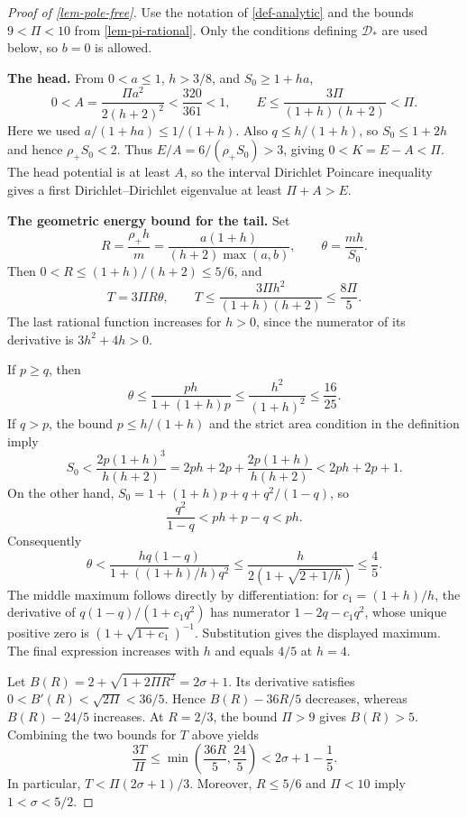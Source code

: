 \documentclass[11pt,a4paper]{article}
\theoremstyle{proofmanuscript}
\begin{document}
\begin{proof}[Proof of \ref{lem-pole-free}]

Use the notation of \ref{def-analytic} and the bounds \(9<\Pi<10\) from \ref{lem-pi-rational}. Only the conditions defining \(\mathcal D_*\) are used below, so \(b=0\) is allowed.

\textbf{The head.} From \(0<a\le1\), \(h>3/8\), and \(S_0\ge1+ha\), \[
0<A=\frac{\Pi a^2}{2(h+2)^2}<\frac{320}{361}<1,
\qquad E\le\frac{3\Pi}{(1+h)(h+2)}<\Pi.
\] Here we used \(a/(1+ha)\le1/(1+h)\). Also \(q\le h/(1+h)\), so \(S_0\le1+2h\) and hence \(\rho_+S_0<2\). Thus \(E/A=6/(\rho_+S_0)>3\), giving \(0<K=E-A<\Pi\). The head potential is at least \(A\), so the interval Dirichlet Poincare inequality gives a first Dirichlet--Dirichlet eigenvalue at least \(\Pi+A>E\).

\textbf{The geometric energy bound for the tail.} Set \[
R=\frac{\rho_+h}{m}=\frac{a(1+h)}{(h+2)\max(a,b)},
\qquad \theta=\frac{mh}{S_0}.
\] Then \(0<R\le(1+h)/(h+2)\le5/6\), and \[
T=3\Pi R\theta,\qquad
T\le\frac{3\Pi h^2}{(1+h)(h+2)}\le\frac{8\Pi}{5}.\tag{R.4.3}
\] The last rational function increases for \(h>0\), since the numerator of its derivative is \(3h^2+4h>0\).

If \(p\ge q\), then \[
\theta\le\frac{ph}{1+(1+h)p}\le\frac{h^2}{(1+h)^2}\le\frac{16}{25}.
\] If \(q>p\), the bound \(p\le h/(1+h)\) and the strict area condition in the definition imply \[
S_0<\frac{2p(1+h)^3}{h(h+2)}
=2ph+2p+\frac{2p(1+h)}{h(h+2)}<2ph+2p+1.
\] On the other hand, \(S_0=1+(1+h)p+q+q^2/(1-q)\), so \[
\frac{q^2}{1-q}<ph+p-q<ph.
\] Consequently \[
\theta<\frac{h q(1-q)}{1+((1+h)/h)q^2}
\le\frac{h}{2(1+\sqrt{2+1/h})}\le\frac45.\tag{R.4.4}
\] The middle maximum follows directly by differentiation: for \(c_1=(1+h)/h\), the derivative of \(q(1-q)/(1+c_1q^2)\) has numerator \(1-2q-c_1q^2\), whose unique positive zero is \((1+\sqrt{1+c_1})^{-1}\). Substitution gives the displayed maximum. The final expression increases with \(h\) and equals \(4/5\) at \(h=4\).

Let \(B(R)=2+\sqrt{1+2\Pi R^2}=2\sigma+1\). Its derivative satisfies \(0<B'(R)<\sqrt{2\Pi}<36/5\). Hence \(B(R)-36R/5\) decreases, whereas \(B(R)-24/5\) increases. At \(R=2/3\), the bound \(\Pi>9\) gives \(B(R)>5\). Combining the two bounds for \(T\) above yields \[
\frac{3T}{\Pi}\le\min\!\left(\frac{36R}{5},\frac{24}{5}\right)
<2\sigma+1-\frac15.\tag{R.4.5}
\] In particular, \(T<\Pi(2\sigma+1)/3\). Moreover, \(R\le5/6\) and \(\Pi<10\) imply \(1<\sigma<5/2\).


\end{proof}
\end{document}
